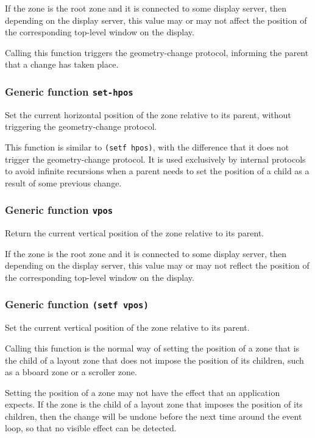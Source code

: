\documentclass{report}
\begin{document}
If the zone is the root zone and it is connected to some display
server, then depending on the display server, this value may or
may not affect the position of the corresponding top-level window
on the display.

Calling this function triggers the geometry-change protocol,
informing the parent that a change has taken place.  

\subsubsection{Generic function \texttt{set-hpos}}

Set the current horizontal position of the zone relative to its
parent, without triggering the geometry-change protocol.

This function is similar to \texttt{(setf hpos)}, with the difference
that it does not trigger the geometry-change protocol.  It is used
exclusively by internal protocols to avoid infinite recursions when a
parent needs to set the position of a child as a result of some
previous change.

\subsubsection{Generic function \texttt{vpos}}

Return the current vertical position of the zone relative to its
parent.  

If the zone is the root zone and it is connected to some display
server, then depending on the display server, this value may or
may not reflect the position of the corresponding top-level window
on the display.

\subsubsection{Generic function \texttt{(setf vpos)}}

Set the current vertical position of the zone relative to its
parent.

Calling this function is the normal way of setting the position of
a zone that is the child of a layout zone that does not impose the
position of its children, such as a bboard zone or a scroller
zone.

Setting the position of a zone may not have the effect that an
application expects.  If the zone is the child of a layout zone
that imposes the position of its children, then the change will be
undone before the next time around the event loop, so that no
visible effect can be detected.  
\end{document}
